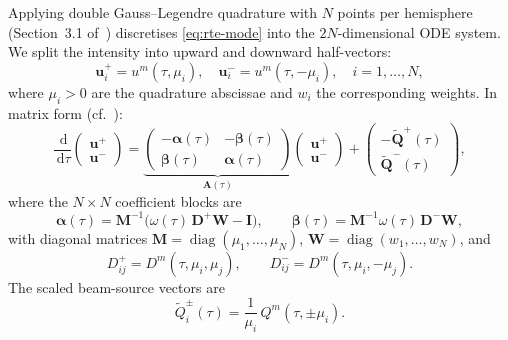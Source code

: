 \documentclass[11pt,a4paper]{article}
\newcommand{\diag}{\operatorname{diag}}
\newcommand{\vect}[1]{\bm{#1}}
\newcommand{\mat}[1]{\mathbf{#1}}
\newcommand{\dd}{\,\mathrm{d}}
\theoremstyle{definition}
\begin{document}
Applying double Gauss--Legendre quadrature with $N$ points per hemisphere
(Section~3.1 of~\cite{HP2024doc}) discretises \eqref{eq:rte-mode} into
the $2N$-dimensional ODE system.  We split the intensity into upward and
downward half-vectors:
\[
  \vect{u}^+_i = u^m(\tau, \mu_i), \quad
  \vect{u}^-_i = u^m(\tau, -\mu_i), \quad
  i = 1,\ldots,N,
\]
where $\mu_i > 0$ are the quadrature abscissae and $w_i$ the
corresponding weights.  In matrix form (cf.\ \cite[Section~3.4]{HP2024doc}):
\begin{equation}\label{eq:2N-system}
  \frac{\dd}{\dd\tau}
  \begin{pmatrix} \vect{u}^+ \\ \vect{u}^- \end{pmatrix}
  = \underbrace{
    \begin{pmatrix} -\mat{\alpha}(\tau) & -\mat{\beta}(\tau) \\
                     \mat{\beta}(\tau)  &  \mat{\alpha}(\tau) \end{pmatrix}
  }_{\displaystyle \mat{A}(\tau)}
  \begin{pmatrix} \vect{u}^+ \\ \vect{u}^- \end{pmatrix}
  +
  \begin{pmatrix} -\tilde{\vect{Q}}^+(\tau) \\
                   \tilde{\vect{Q}}^-(\tau) \end{pmatrix},
\end{equation}
where the $N\!\times\!N$ coefficient blocks are
\begin{equation}\label{eq:alpha-beta}
  \mat{\alpha}(\tau)
  = \mat{M}^{-1}\!\bigl(\omega(\tau)\,\mat{D}^+\!\mat{W} - \mat{I}\bigr),
  \qquad
  \mat{\beta}(\tau)
  = \mat{M}^{-1}\omega(\tau)\,\mat{D}^-\!\mat{W},
\end{equation}
with diagonal matrices $\mat{M} = \diag(\mu_1,\ldots,\mu_N)$,
$\mat{W} = \diag(w_1,\ldots,w_N)$, and
\begin{equation}\label{eq:Dpm}
  D^+_{ij} = D^m(\tau, \mu_i, \mu_j),
  \qquad
  D^-_{ij} = D^m(\tau, \mu_i, -\mu_j).
\end{equation}
The scaled beam-source vectors are
\begin{equation}\label{eq:Qtilde}
  \tilde{Q}^\pm_i(\tau) = \frac{1}{\mu_i}\, Q^m(\tau, \pm\mu_i).
\end{equation}
\end{document}
